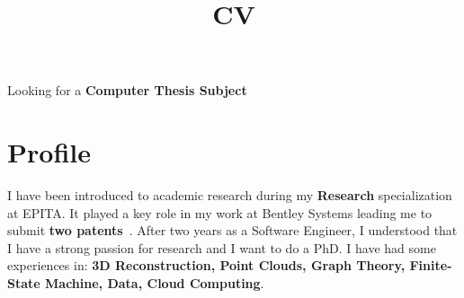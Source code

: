 \documentclass[11pt,a4paper,sans]{moderncv}
\title{CV}
\begin{document}
\makecvtitle
\vspace{-1cm}
\begin{center}
  Looking for a \textbf{Computer Thesis Subject}
\end{center}

\section{Profile}
I have been introduced to academic research during my \textbf{Research} specialization at EPITA.
It played a key role in my work at Bentley Systems leading me to submit \textbf{two patents}~\cite{patent.scanfinder1,patent.scanfinder2}. After two years as a
Software Engineer, I understood that I have a strong passion for research and I want to do a PhD.
I have had some experiences in: \textbf{3D Reconstruction, Point Clouds, Graph Theory, Finite-State Machine, Data, Cloud Computing}.
\end{document}
